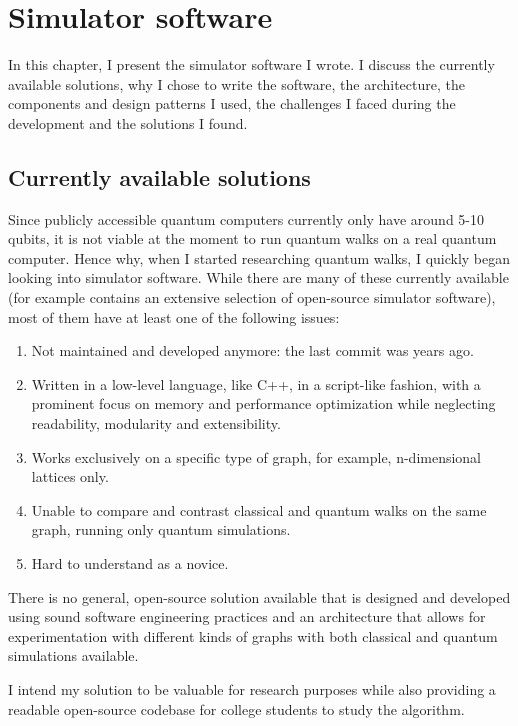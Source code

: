 \chapter{Simulator software}

In this chapter, I present the simulator software I wrote. I discuss the currently available solutions, why I chose to write the software, the architecture, the components and design patterns I used, the challenges I faced during the development and the solutions I found.

\section{Currently available solutions}

Since publicly accessible quantum computers currently only have around 5-10 qubits, it is not viable at the moment to run quantum walks on a real quantum computer. Hence why, when I started researching quantum walks, I quickly began looking into simulator software. While there are many of these currently available (for example \cite{Portugal} contains an extensive selection of open-source simulator software), most of them have at least one of the following issues:

\begin{enumerate}
\item Not maintained and developed anymore: the last commit was years ago.
\item Written in a low-level language, like C++, in a script-like fashion, with a prominent focus on memory and performance optimization while neglecting readability, modularity and extensibility.
\item Works exclusively on a specific type of graph, for example, n-dimensional lattices only.
\item Unable to compare and contrast classical and quantum walks on the same graph, running only quantum simulations.
\item Hard to understand as a novice.
\end{enumerate}

There is no general, open-source solution available that is designed and developed using sound software engineering practices and an architecture that allows for experimentation with different kinds of graphs with both classical and quantum simulations available.

I intend my solution to be valuable for research purposes while also providing a readable open-source codebase for college students to study the algorithm.

